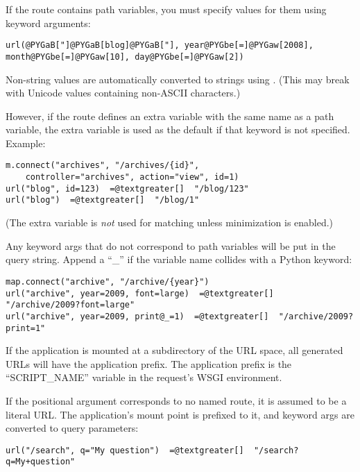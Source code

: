 \documentclass[letterpaper,10pt,english]{manual}
\begin{document}
If the route contains path variables, you must specify values for them using
keyword arguments:

\begin{Verbatim}[commandchars=@\[\]]
url(@PYGaB["]@PYGaB[blog]@PYGaB["], year@PYGbe[=]@PYGaw[2008], month@PYGbe[=]@PYGaw[10], day@PYGbe[=]@PYGaw[2])
\end{Verbatim}

Non-string values are automatically converted to strings using .
(This may break with Unicode values containing non-ASCII characters.)

However, if the route defines an extra variable with the same name as a path
variable, the extra variable is used as the default if that keyword is not
specified.  Example:

\begin{Verbatim}[commandchars=@\[\]]
m.connect("archives", "/archives/{id}",
    controller="archives", action="view", id=1)
url("blog", id=123)  =@textgreater[]  "/blog/123"
url("blog")  =@textgreater[]  "/blog/1"
\end{Verbatim}

(The extra variable is \emph{not} used for matching unless minimization is enabled.)

Any keyword args that do not correspond to path variables will be put in the
query string.  Append a ``\_'' if the variable name collides with a Python
keyword:

\begin{Verbatim}[commandchars=@\[\]]
map.connect("archive", "/archive/{year}")
url("archive", year=2009, font=large)  =@textgreater[]  "/archive/2009?font=large"
url("archive", year=2009, print@_=1)  =@textgreater[]  "/archive/2009?print=1"
\end{Verbatim}

If the application is mounted at a subdirectory of the URL space,
all generated URLs will have the application prefix.  The application prefix is
the ``SCRIPT\_NAME'' variable in the request's WSGI environment.

If the positional argument corresponds to no named route, it is assumed to be a
literal URL.  The application's mount point is prefixed to it, and keyword args
are converted to query parameters:

\begin{Verbatim}[commandchars=@\[\]]
url("/search", q="My question")  =@textgreater[]  "/search?q=My+question"
\end{Verbatim}
\end{document}
